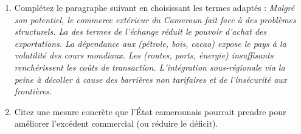 \documentclass[11pt]{article}
\begin{document}
\begin{exercice}
\begin{enumerate}
    \item Complétez le paragraphe suivant en choisissant les termes adaptés :
    \textit{Malgré son potentiel, le commerce extérieur du Cameroun fait face à des problèmes structurels. La \underline{\hspace{3cm}} des termes de l'échange réduit le pouvoir d'achat des exportations. La dépendance aux \underline{\hspace{3cm}} (pétrole, bois, cacao) expose le pays à la volatilité des cours mondiaux. Les \underline{\hspace{3cm}} (routes, ports, énergie) insuffisants renchérissent les coûts de transaction. L'intégration sous-régionale via la \underline{\hspace{3cm}} peine à décoller à cause des barrières non tarifaires et de l'insécurité aux frontières.}
    \item Citez une mesure concrète que l'État camerounais pourrait prendre pour améliorer l'excédent commercial (ou réduire le déficit).
\end{enumerate}
\end{exercice}
\end{document}
